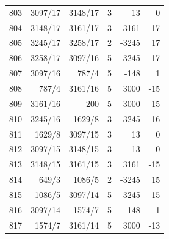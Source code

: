 \documentclass[11pt,a4paper]{article}
\begin{document}
\begin{minipage}[t]{.49\linewidth}
\begin{tabular*}{\linewidth}{@{}r@{\extracolsep{\fill}}rrrrr@{}}
803 & 3097/17 & 3148/17 & 3 & 13 & 0\\
804 & 3148/17 & 3161/17 & 3 & 3161 & -17\\
805 & 3245/17 & 3258/17 & 2 & -3245 & 17\\
806 & 3258/17 & 3097/16 & 5 & -3245 & 17\\
807 & 3097/16 & 787/4 & 5 & -148 & 1\\
808 & 787/4 & 3161/16 & 5 & 3000 & -15\\
809 & 3161/16 & 200 & 5 & 3000 & -15\\
810 & 3245/16 & 1629/8 & 3 & -3245 & 16\\
811 & 1629/8 & 3097/15 & 3 & 13 & 0\\
812 & 3097/15 & 3148/15 & 3 & 13 & 0\\
813 & 3148/15 & 3161/15 & 3 & 3161 & -15\\
814 & 649/3 & 1086/5 & 2 & -3245 & 15\\
815 & 1086/5 & 3097/14 & 5 & -3245 & 15\\
816 & 3097/14 & 1574/7 & 5 & -148 & 1\\
817 & 1574/7 & 3161/14 & 5 & 3000 & -13\\
\bottomrule\end{tabular*}\end{minipage}\hfill
\end{document}
